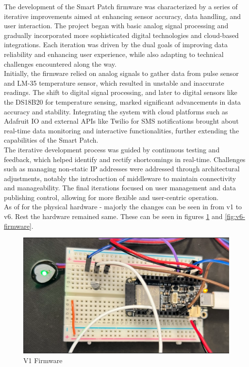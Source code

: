 The development of the Smart Patch firmware was characterized by a series of iterative improvements aimed at enhancing sensor accuracy, data handling, and user interaction. The project began with basic analog signal processing and gradually incorporated more sophisticated digital technologies and cloud-based integrations. Each iteration was driven by the dual goals of improving data reliability and enhancing user experience, while also adapting to technical challenges encountered along the way. \\

\noindent Initially, the firmware relied on analog signals to gather data from pulse sensor and LM-35 temperature sensor, which resulted in unstable and inaccurate readings. The shift to digital signal processing, and later to digital sensors like the DS18B20 for temperature sensing, marked significant advancements in data accuracy and stability. Integrating the system with cloud platforms such as Adafruit IO and external APIs like Twilio for SMS notifications brought about real-time data monitoring and interactive functionalities, further extending the capabilities of the Smart Patch. \\

\noindent The iterative development process was guided by continuous testing and feedback, which helped identify and rectify shortcomings in real-time. Challenges such as managing non-static IP addresses were addressed through architectural adjustments, notably the introduction of middleware to maintain connectivity and manageability. The final iterations focused on user management and data publishing control, allowing for more flexible and user-centric operation. \\

\noindent As of for the physical hardware - majorly the changes can be seen in from v1 to v6. Rest the hardware remained same. These can be seen in figures \ref{fig:v1-firmware} and \ref{fig:v6-firmware}.

\begin{figure}[h!]
    \centering
    \includegraphics[width=1\linewidth]{images/v1-firmware.png}
    \caption{V1 Firmware}
    \label{fig:v1-firmware}
\end{figure}

